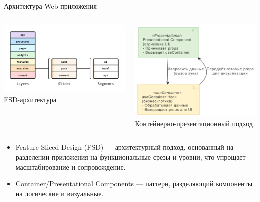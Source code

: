 \documentclass[aspectratio=169]{beamer}
\begin{document}
\begin{frame}{Архитектура Web-приложения}
\begin{columns}
    \begin{column}{0.45\textwidth}
        \centering
        \includegraphics[width=0.8\linewidth]{static/fsd-diagram.png} \\
        \small FSD-архитектура
    \end{column}
    \begin{column}{0.45\textwidth}
        \centering
        \includegraphics[width=0.8\linewidth]{static/container-presentational.png} \\
        \small Контейнерно-презентационный подход
    \end{column}
\end{columns}

\vspace{0.5em}

\small
\begin{itemize}
  \item Feature-Sliced Design (FSD) — архитектурный подход, основанный на разделении приложения на функциональные срезы и уровни, что упрощает масштабирование и сопровождение.
  \item Container/Presentational Components — паттерн, разделяющий компоненты на логические и визуальные.
\end{itemize}

\end{frame}
\end{document}
